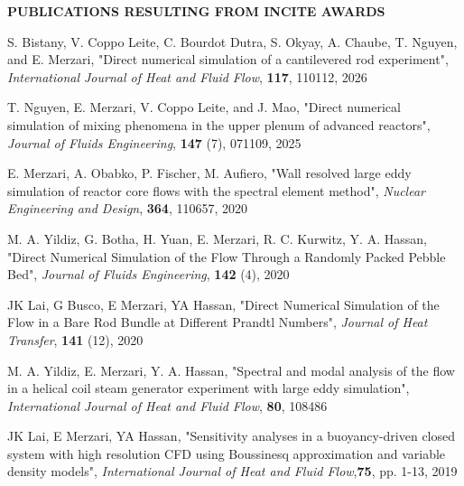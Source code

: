 \documentclass[11pt,letterpaper,english]{article}
\begin{document}
\setlength{\parindent}{0in} %
\pagestyle{fancy}   \renewcommand{%
\headrulewidth}{0.0pt}

\begin{center}
\bf {PUBLICATIONS RESULTING FROM INCITE AWARDS} \\
\end{center}
\vspace{-.25in}

S. Bistany, V. Coppo Leite, C. Bourdot Dutra, S. Okyay, A. Chaube, T. Nguyen, and E. Merzari, "Direct numerical simulation of a cantilevered rod experiment", \textit{International Journal of Heat and Fluid Flow}, \textbf{117}, 110112, 2026 

T. Nguyen, E. Merzari, V. Coppo Leite, and J. Mao, "Direct numerical simulation of mixing phenomena in the upper plenum of advanced reactors", \textit{Journal of Fluids Engineering}, \textbf{147} (7), 071109, 2025

E. Merzari, A. Obabko, P. Fischer, M. Aufiero, "Wall resolved large eddy simulation of reactor core flows with the spectral element method", \textit{Nuclear Engineering and Design}, \textbf{364}, 110657, 2020

M. A. Yildiz, G. Botha, H. Yuan, E. Merzari, R. C. Kurwitz, Y. A. Hassan, "Direct Numerical Simulation of the Flow Through a Randomly Packed Pebble Bed", \textit{Journal of Fluids Engineering}, \textbf{142} (4), 2020

JK Lai, G Busco, E Merzari, YA Hassan, "Direct Numerical Simulation of the Flow in a Bare Rod Bundle at Different Prandtl Numbers", \textit{Journal of Heat Transfer},  \textbf{141} (12), 2020

M. A. Yildiz, E. Merzari, Y. A. Hassan, "Spectral and modal analysis of the flow in a helical coil steam generator experiment with large eddy simulation", \textit{International Journal of Heat and Fluid Flow},  \textbf{80}, 108486

JK Lai, E Merzari, YA Hassan, "Sensitivity analyses in a buoyancy-driven closed system with high resolution CFD using Boussinesq approximation and variable density models", \textit{International Journal of Heat and Fluid Flow},\textbf{75}, pp. 1-13, 2019
\end{document}
